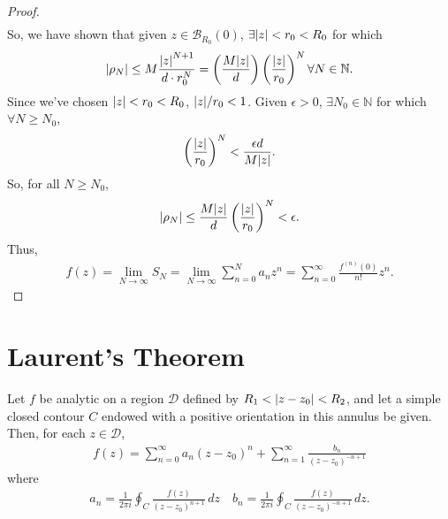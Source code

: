 \documentclass{article}
\theoremstyle{definition}
\newcommand{\f}[2]{\frac{#1}{#2}}
\newcommand{\B}{\mathcal{B}}
\newcommand{\lp}{\left(}
\newcommand{\rp}{\right)}
\begin{document}
\begin{proof}
\begin{align}
	\end{align}
	So, we have shown that given $z\in \B_{R_0}(0)$, $\exists \abs{z} < r_0 < R_0$ for which 
	\begin{align}
	\abs{\rho_N} \leq M \f{\abs{z}^{N+1}}{d\cdot r_0^N} = \lp \f{M\abs{z}}{d} \rp\lp \f{\abs{z}}{r_0} \rp^N \forall N \in \mathbb{N}.
	\end{align}
	Since we've chosen $\abs{z} < r_0 < R_0$, $\abs{z} / r_0 < 1$. Given $\epsilon > 0$, $\exists N_0 \in \mathbb{N}$ for which $\forall N \geq N_0$, 
	\begin{align}
	\lp \f{\abs{z}}{r_0} \rp^N < \f{\epsilon d}{M \abs{z}}.
	\end{align}
	So, for all $N \geq N_0$, 
	\begin{align}
	\abs{\rho_N} \leq \f{M\abs{z}}{d}\lp \f{\abs{z}}{r_0} \rp^N < \epsilon.
	\end{align}
	Thus, 
	\begin{align}
	f(z) = \lim_{N\to \infty} S_N = \lim_{N\to \infty} \sum^N_{n=0}a_n z^n = \sum^\infty_{n=0}\f{f^{(n)}(0)}{n!}z^n.
	\end{align}
\end{proof}






\section{Laurent's Theorem}

Let $f$ be analytic on a region $\mathcal{D}$ defined by $R_1 < \abs{z - z_0} < R_2$, and let a simple closed contour $C$ endowed with a positive orientation in this annulus be given. Then, for each $z \in \mathcal{D}$, 
\begin{align}
f(z) = \sum_{n =0}^\infty a_n (z - z_0)^n + \sum_{n = 1}^\infty \f{b_n}{ (z - z_0)^{-n+1}}
\end{align}
where
\begin{align}
a_n  = \f{1}{2\pi i }\oint_C \f{f(z)}{(z - z_0)^{n+1}}\,dz \quad b_n = \f{1}{2\pi i}\oint_C \f{f(z)}{(z - z_0)^{-n+1}}\,dz.
\end{align}
\end{document}
